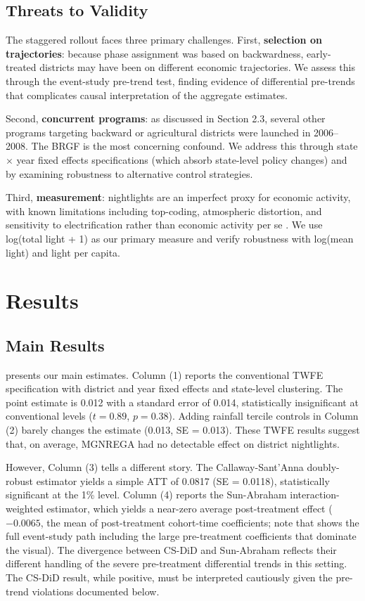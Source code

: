 \documentclass[12pt]{article}
\begin{document}
\subsection{Threats to Validity}

The staggered rollout faces three primary challenges. First, \textbf{selection on trajectories}: because phase assignment was based on backwardness, early-treated districts may have been on different economic trajectories. We assess this through the event-study pre-trend test, finding evidence of differential pre-trends that complicates causal interpretation of the aggregate estimates.

Second, \textbf{concurrent programs}: as discussed in Section 2.3, several other programs targeting backward or agricultural districts were launched in 2006--2008. The BRGF is the most concerning confound. We address this through state $\times$ year fixed effects specifications (which absorb state-level policy changes) and by examining robustness to alternative control strategies.

Third, \textbf{measurement}: nightlights are an imperfect proxy for economic activity, with known limitations including top-coding, atmospheric distortion, and sensitivity to electrification rather than economic activity per se \citep{gibson2021night}. We use log(total light + 1) as our primary measure and verify robustness with log(mean light) and light per capita.


\section{Results}

\subsection{Main Results}

 presents our main estimates. Column (1) reports the conventional TWFE specification with district and year fixed effects and state-level clustering. The point estimate is 0.012 with a standard error of 0.014, statistically insignificant at conventional levels ($t = 0.89$, $p = 0.38$). Adding rainfall tercile controls in Column (2) barely changes the estimate (0.013, SE = 0.013). These TWFE results suggest that, on average, MGNREGA had no detectable effect on district nightlights.

However, Column (3) tells a different story. The Callaway-Sant'Anna doubly-robust estimator yields a simple ATT of 0.0817 (SE = 0.0118), statistically significant at the 1\% level. Column (4) reports the Sun-Abraham interaction-weighted estimator, which yields a near-zero average post-treatment effect ($-0.0065$, the mean of post-treatment cohort-time coefficients; note that  shows the full event-study path including the large pre-treatment coefficients that dominate the visual). The divergence between CS-DiD and Sun-Abraham reflects their different handling of the severe pre-treatment differential trends in this setting. The CS-DiD result, while positive, must be interpreted cautiously given the pre-trend violations documented below.
\end{document}
